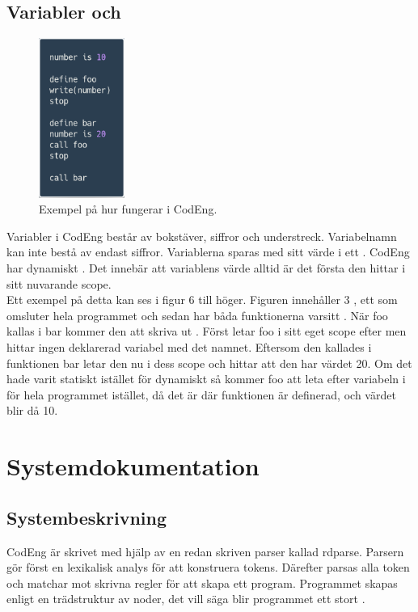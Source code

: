 \documentclass{article}
\begin{document}
\subsection{Variabler och }
\begin{figure}
    \centering
    \includegraphics[width=0.25\textwidth]{scopecode.png}
    \caption{Exempel på hur  fungerar i CodEng.}
\end{figure}
Variabler i CodEng består av bokstäver, siffror och understreck. Variabelnamn  kan inte bestå av endast siffror. Variablerna sparas med sitt värde i ett . CodEng har dynamiskt . Det innebär att variablens värde alltid är det första den hittar i sitt nuvarande scope. \\ \newline
Ett exempel på detta kan ses i figur 6 till höger. Figuren innehåller 3 , ett som omsluter hela programmet och sedan har båda funktionerna varsitt . När foo kallas i bar kommer den att skriva ut . Först letar foo i sitt eget scope efter  men hittar ingen deklarerad variabel med det namnet. Eftersom den kallades i funktionen bar letar den nu i dess scope och hittar att den har värdet 20. Om det hade varit statiskt  istället för dynamiskt så kommer foo att leta efter variabeln i  för hela programmet istället, då det är där funktionen är definerad, och värdet blir då 10.
\newpage
\section{Systemdokumentation}
\subsection{Systembeskrivning}
CodEng är skrivet med hjälp av en redan skriven parser kallad rdparse. Parsern gör först en lexikalisk analys för att konstruera tokens. Därefter parsas alla token och matchar mot skrivna regler för att skapa ett program. Programmet skapas enligt en trädstruktur av noder, det vill säga blir programmet ett stort .
\end{document}
